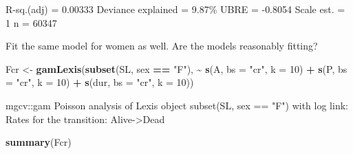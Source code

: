 \documentclass[
]{book}
\newenvironment{Shaded}{\begin{snugshade}}{\end{snugshade}}
\newcommand{\AttributeTok}[1]{\textcolor[rgb]{0.13,0.29,0.53}{#1}}
\newcommand{\DecValTok}[1]{\textcolor[rgb]{0.00,0.00,0.81}{#1}}
\newcommand{\FunctionTok}[1]{\textcolor[rgb]{0.13,0.29,0.53}{\textbf{#1}}}
\newcommand{\NormalTok}[1]{#1}
\newcommand{\OtherTok}[1]{\textcolor[rgb]{0.56,0.35,0.01}{#1}}
\newcommand{\SpecialCharTok}[1]{\textcolor[rgb]{0.81,0.36,0.00}{\textbf{#1}}}
\newcommand{\StringTok}[1]{\textcolor[rgb]{0.31,0.60,0.02}{#1}}
\begin{document}
\begin{enumerate}
\begin{Shaded}
\begin{Highlighting}[]
\NormalTok{R{-}sq.(adj) =  0.00333   Deviance explained = 9.87\%}
\NormalTok{UBRE = {-}0.8054  Scale est. = 1         n = 60347}
\end{Highlighting}
\end{Shaded}

  Fit the same model for women as well. Are the models reasonably fitting?

\begin{Shaded}
\begin{Highlighting}[]
\NormalTok{Fcr }\OtherTok{\textless{}{-}} \FunctionTok{gamLexis}\NormalTok{(}\FunctionTok{subset}\NormalTok{(SL, sex }\SpecialCharTok{==} \StringTok{"F"}\NormalTok{),}
                 \SpecialCharTok{\textasciitilde{}} \FunctionTok{s}\NormalTok{(A, }\AttributeTok{bs =} \StringTok{"cr"}\NormalTok{, }\AttributeTok{k =} \DecValTok{10}\NormalTok{) }\SpecialCharTok{+}
                   \FunctionTok{s}\NormalTok{(P, }\AttributeTok{bs =} \StringTok{"cr"}\NormalTok{, }\AttributeTok{k =} \DecValTok{10}\NormalTok{) }\SpecialCharTok{+}
                 \FunctionTok{s}\NormalTok{(dur, }\AttributeTok{bs =} \StringTok{"cr"}\NormalTok{, }\AttributeTok{k =} \DecValTok{10}\NormalTok{))}
\end{Highlighting}
\end{Shaded}

\begin{Shaded}
\begin{Highlighting}[]
\NormalTok{mgcv::gam Poisson analysis of Lexis object subset(SL, sex == "F") with log link:}
\NormalTok{Rates for the transition:}
\NormalTok{Alive{-}\textgreater{}Dead}
\end{Highlighting}
\end{Shaded}

\begin{Shaded}
\begin{Highlighting}[]
\FunctionTok{summary}\NormalTok{(Fcr)}
\end{Highlighting}
\end{Shaded}

\begin{Shaded}
\end{Shaded}
\end{enumerate}
\end{document}
